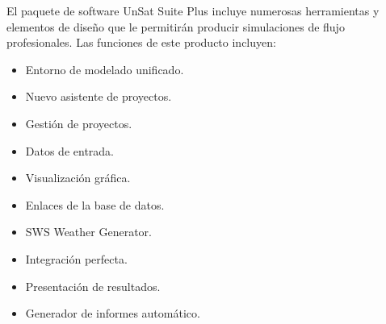 El paquete de software UnSat Suite Plus incluye numerosas herramientas y elementos de diseño que le permitirán producir simulaciones de flujo profesionales. Las funciones de este producto incluyen:

\begin{itemize}
	\item Entorno de modelado unificado.
	\item Nuevo asistente de proyectos.
	\item Gestión de proyectos.
	\item Datos de entrada.
	\item Visualización gráfica.
	\item Enlaces de la base de datos.
	\item SWS Weather Generator.
	\item Integración perfecta.
	\item Presentación de resultados.
	\item Generador de informes automático.
\end{itemize}

